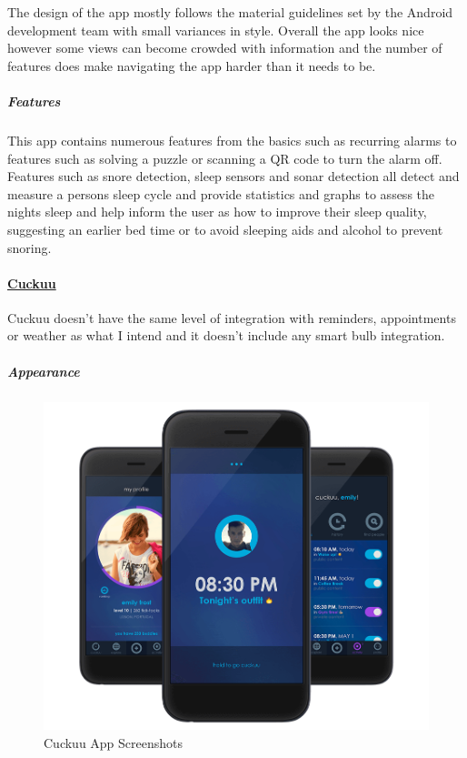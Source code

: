 The design of the app mostly follows the material guidelines set by the
Android development team with small variances in style. Overall the app
looks nice however some views can become crowded with information and
the number of features does make navigating the app harder than it needs
to be.

\subparagraph{Features}\label{features}

This app contains numerous features from the basics such as recurring
alarms to features such as solving a puzzle or scanning a QR code to
turn the alarm off. Features such as snore detection, sleep sensors and
sonar detection all detect and measure a persons sleep cycle and provide
statistics and graphs to assess the nights sleep and help inform the
user as how to improve their sleep quality, suggesting an earlier bed
time or to avoid sleeping aids and alcohol to prevent snoring.

\paragraph{\texorpdfstring{\href{https://cuckuu.com/}{Cuckuu}}{Cuckuu}}\label{cuckuu}

Cuckuu doesn't have the same level of integration with reminders,
appointments or weather as what I intend and it doesn't include any
smart bulb integration.

\subparagraph{Appearance}\label{appearance-1}

\begin{figure}
  \begin{center}
    \includegraphics[scale=0.25,keepaspectratio]{Images/cuckuu.png}
    \caption{Cuckuu App Screenshots}
  \end{center}
\end{figure}

